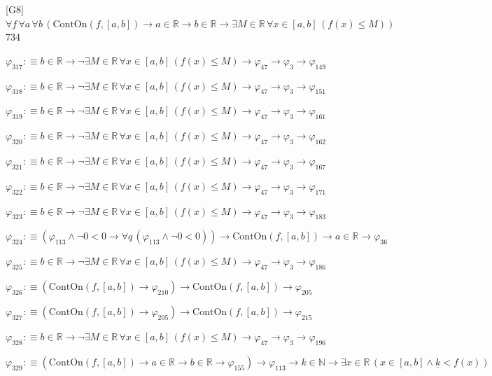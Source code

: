 \begin{fullproof}{[G8]}{$\forall f\,\forall a\,\forall b\,(\mathrm{ContOn}(f,[a,b]) \to a \in \mathbb{R} \to b \in \mathbb{R} \to \exists M \in \mathbb{R}\,\forall x \in [a,b]\,(f(x) \leq M))$}{734}
\begin{abbrevlist}
\item $\varphi_{317} :\equiv b \in \mathbb{R} \to \neg \exists M \in \mathbb{R}\,\forall x \in [a,b]\,(f(x) \leq M) \to \varphi_{47} \to \varphi_{3} \to \varphi_{149}$
\item $\varphi_{318} :\equiv b \in \mathbb{R} \to \neg \exists M \in \mathbb{R}\,\forall x \in [a,b]\,(f(x) \leq M) \to \varphi_{47} \to \varphi_{3} \to \varphi_{151}$
\item $\varphi_{319} :\equiv b \in \mathbb{R} \to \neg \exists M \in \mathbb{R}\,\forall x \in [a,b]\,(f(x) \leq M) \to \varphi_{47} \to \varphi_{3} \to \varphi_{161}$
\item $\varphi_{320} :\equiv b \in \mathbb{R} \to \neg \exists M \in \mathbb{R}\,\forall x \in [a,b]\,(f(x) \leq M) \to \varphi_{47} \to \varphi_{3} \to \varphi_{162}$
\item $\varphi_{321} :\equiv b \in \mathbb{R} \to \neg \exists M \in \mathbb{R}\,\forall x \in [a,b]\,(f(x) \leq M) \to \varphi_{47} \to \varphi_{3} \to \varphi_{167}$
\item $\varphi_{322} :\equiv b \in \mathbb{R} \to \neg \exists M \in \mathbb{R}\,\forall x \in [a,b]\,(f(x) \leq M) \to \varphi_{47} \to \varphi_{3} \to \varphi_{171}$
\item $\varphi_{323} :\equiv b \in \mathbb{R} \to \neg \exists M \in \mathbb{R}\,\forall x \in [a,b]\,(f(x) \leq M) \to \varphi_{47} \to \varphi_{3} \to \varphi_{183}$
\item $\varphi_{324} :\equiv (\varphi_{113} \land \neg 0 < 0 \to \forall q\,(\varphi_{113} \land \neg 0 < 0)) \to \mathrm{ContOn}(f,[a,b]) \to a \in \mathbb{R} \to \varphi_{36}$
\item $\varphi_{325} :\equiv b \in \mathbb{R} \to \neg \exists M \in \mathbb{R}\,\forall x \in [a,b]\,(f(x) \leq M) \to \varphi_{47} \to \varphi_{3} \to \varphi_{186}$
\item $\varphi_{326} :\equiv (\mathrm{ContOn}(f,[a,b]) \to \varphi_{210}) \to \mathrm{ContOn}(f,[a,b]) \to \varphi_{205}$
\item $\varphi_{327} :\equiv (\mathrm{ContOn}(f,[a,b]) \to \varphi_{205}) \to \mathrm{ContOn}(f,[a,b]) \to \varphi_{215}$
\item $\varphi_{328} :\equiv b \in \mathbb{R} \to \neg \exists M \in \mathbb{R}\,\forall x \in [a,b]\,(f(x) \leq M) \to \varphi_{47} \to \varphi_{3} \to \varphi_{196}$
\item $\varphi_{329} :\equiv (\mathrm{ContOn}(f,[a,b]) \to a \in \mathbb{R} \to b \in \mathbb{R} \to \varphi_{155}) \to \varphi_{113} \to k \in \mathbb{N} \to \exists x \in \mathbb{R}\,(x \in [a,b] \land \underline{k} < f(x))$

\end{abbrevlist}
\end{fullproof}
